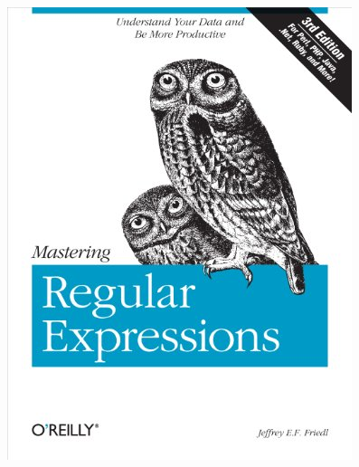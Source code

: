 \documentclass[pdftex,aspectratio=169]{beamer}
\begin{document}
\begin{frame}
\begin{center}
    \includegraphics[scale=0.25]{book-mastering-regular-expressions}
  \end{center}
\end{frame}



\end{document}
